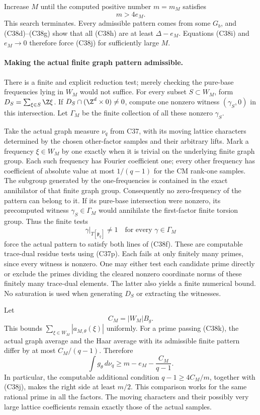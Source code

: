 Increase $M$ until the computed positive number $m=m_M$ satisfies
\[
                              m>4e_M.
 \tag{C38j}
\]
This search terminates.  Every admissible pattern comes from
some $G_b$, and (C38d)--(C38g) show that all (C38h) are at
least $\Delta-e_M$.  Equations (C38i) and $e_M\to0$ therefore
force (C38j) for sufficiently large $M$.

\paragraph{Making the actual finite graph pattern admissible.}
There is a finite and explicit reduction test; merely checking
the pure-base frequencies lying in $W_M$ would not suffice.
For every subset $S\subset W_M$, form $D_S=\sum_{\xi\in S}\Z\xi$.
If $D_S\cap(\Z^d\times0)\ne0$, compute one nonzero witness
$(\gamma_S,0)$ in this intersection.  Let $\Gamma_M$ be the
finite collection of all these nonzero $\gamma_S$.

Take the actual graph measure $\nu_q$ from C37, with its moving
lattice characters determined by the chosen other-factor samples
and their arbitrary lifts.  Mark a frequency $\xi\in W_M$ by
one exactly when it is trivial on the underlying finite graph
group.  Each such frequency has Fourier coefficient one; every
other frequency has coefficient of absolute value at most
$1/(q-1)$ for the CM rank-one samples.  The subgroup generated
by the one-frequencies is contained in the exact annihilator of
that finite graph group.  Consequently no zero-frequency of the
pattern can belong to it.  If its pure-base intersection were
nonzero, its precomputed witness $\gamma_S\in\Gamma_M$ would
annihilate the first-factor finite torsion group.  Thus the
finite tests
\[
       \gamma|_{T[\mathfrak p_q]}\ne1
                     \quad\text{for every }\gamma\in\Gamma_M
 \tag{C38k}
\]
force the actual pattern to satisfy both lines of (C38f).
These are computable trace-dual residue tests using (C37p).
Each fails at only finitely many primes, since every witness is
nonzero.  One may either test each candidate prime directly or
exclude the primes dividing the cleared nonzero coordinate
norms of these finitely many trace-dual elements.  The latter
also yields a finite numerical bound.  No saturation is used
when generating $D_S$ or extracting the witnesses.

Let
\[
             C_M=|W_M|B_g.
\]
This bounds $\sum_{\xi\in W_M}|a_{M,\theta}(\xi)|$ uniformly.
For a prime passing (C38k), the actual graph average and the
Haar average with its admissible finite pattern differ by at
most $C_M/(q-1)$.  Therefore
\[
        \int g_\theta\,d\nu_q
                  \ge m-e_M-\frac{C_M}{q-1}.
 \tag{C38l}
\]
In particular, the computable additional condition
$q-1\ge4C_M/m$, together with (C38j), makes the right side
at least $m/2$.  This comparison works for the same rational
prime in all the factors.  The moving characters and their
possibly very large lattice coefficients remain exactly those
of the actual samples.

